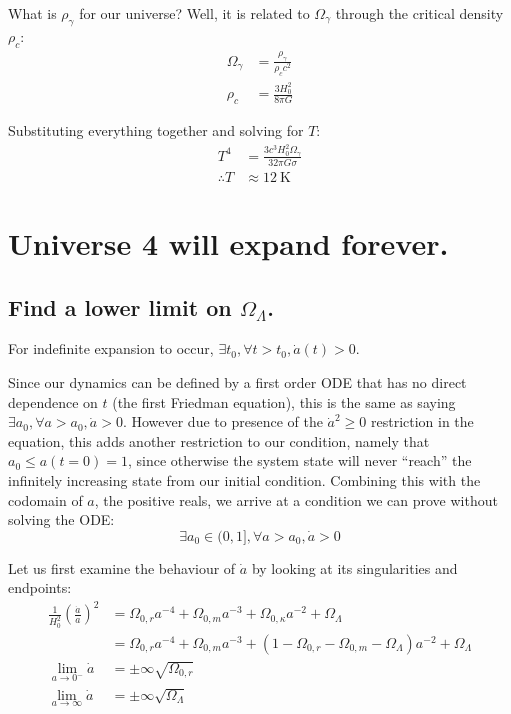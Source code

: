 \documentclass[a4paper]{scrartcl}
\begin{document}
What is \(\rho_\gamma\) for our universe? Well, it is related to \(\Omega_\gamma\) through the critical density \(\rho_c\):
\begin{align*}
    \Omega_\gamma &= \frac{\rho_\gamma}{\rho_c c^2} \\
    \rho_c &= \frac{3 H_0^2}{8 \pi G}
\end{align*}

Substituting everything together and solving for \(T\):
\begin{align*}
    T^4 &= \frac{3 c^3 H_0^2 \Omega_\gamma}{32 \pi G \sigma} \\
    \therefore T &\approx \SI{12}{\kelvin}
\end{align*}

\section{Universe 4 will expand forever.}
\subsection{Find a lower limit on \(\Omega_\Lambda\).}
For indefinite expansion to occur, \(\exists t_0, \forall t > t_0, \dot{a}(t) > 0\).

Since our dynamics can be defined by a first order ODE that has no direct dependence on \(t\) (the first Friedman equation), this is the same as saying \(\exists a_0, \forall a > a_0, \dot{a} > 0\). However due to presence of the \(\dot{a}^2 \ge 0\) restriction in the equation, this adds another restriction to our condition, namely that \(a_0 \le a(t = 0) = 1\), since otherwise the system state will never ``reach'' the infinitely increasing state from our initial condition. Combining this with the codomain of \(a\), the positive reals, we arrive at a condition we can prove without solving the ODE:
\[\exists a_0 \in (0, 1], \forall a > a_0, \dot{a} > 0\]

Let us first examine the behaviour of \(\dot{a}\) by looking at its singularities and endpoints:
\begin{align*}
    \frac{1}{H_0^2} \left(\frac{\dot{a}}{a}\right)^2 &= \Omega_{0, r} a^{-4} + \Omega_{0, m} a^{-3} + \Omega_{0, \kappa} a^{-2} + \Omega_\Lambda \\
    &= \Omega_{0, r} a^{-4} + \Omega_{0, m} a^{-3} + \left(1 - \Omega_{0, r} - \Omega_{0, m} - \Omega_\Lambda\right) a^{-2} + \Omega_\Lambda \\
    \lim_{a \to 0^-} \dot{a} &= \pm\infty \sqrt{\Omega_{0, r}} \\
    \lim_{a \to \infty} \dot{a} &= \pm\infty \sqrt{\Omega_\Lambda}
\end{align*}
\end{document}
